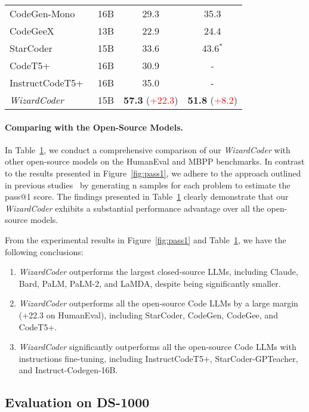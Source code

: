 \documentclass{article}
\newcommand{\modelname}{\emph{WizardCoder}}
\begin{document}
\begin{table}
\begin{tabular}{lccc}
        CodeGen-Mono~\cite{codegen} & 16B & 29.3 & 35.3\\
        CodeGeeX~\cite{CodeGeeX} & 13B & 22.9 & 24.4\\
        StarCoder~\cite{li2023starcoder} & 15B & 33.6 & 43.6$^*$\\
        CodeT5+~\cite{CodeT5+} & 16B & 30.9 & -\\
        InstructCodeT5+~\cite{CodeT5+} & 16B & 35.0 & -\\
        \midrule
        \modelname & 15B & \textbf{57.3} (\textcolor{red}{+22.3}) & \textbf{51.8} (\textcolor{red}{+8.2})\\
        \bottomrule
    \end{tabular}
    \label{tab:humaneval_mbpp}
\end{table} 
\paragraph{Comparing with the Open-Source Models.} In Table~\ref{tab:humaneval_mbpp}, we conduct a comprehensive comparison of our \modelname{} with other open-source models on the HumanEval and MBPP benchmarks. In contrast to the results presented in Figure~\ref{fig:pass1}, we adhere to the approach outlined in previous studies~\cite{humeval} by generating n samples for each problem to estimate the pass@1 score. The findings presented in Table~\ref{tab:humaneval_mbpp} clearly demonstrate that our \modelname{} exhibits a substantial performance advantage over all the open-source models.

From the experimental results in Figure~\ref{fig:pass1} and Table~\ref{tab:humaneval_mbpp}, we have the following conclusions:
\begin{enumerate}
    \item \modelname{} outperforms the largest closed-source LLMs, including Claude, Bard, PaLM, PaLM-2, and LaMDA, despite being significantly smaller.
    \item \modelname{} outperforms all the open-source Code LLMs by a large margin (+22.3 on HumanEval), including StarCoder, CodeGen, CodeGee, and CodeT5+.
    \item \modelname{} significantly outperforms all the open-source Code LLMs with instructions fine-tuning, including InstructCodeT5+, StarCoder-GPTeacher, and Instruct-Codegen-16B.
\end{enumerate}

\subsection{Evaluation on DS-1000}
\end{document}

